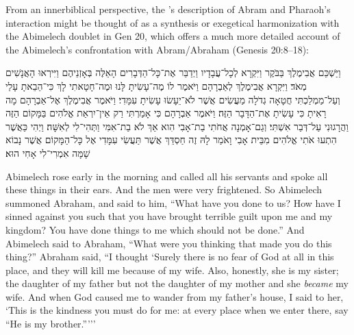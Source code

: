 From an innerbiblical perspective, the \ga's description of Abram and Pharaoh's interaction might be thought of as a synthesis or exegetical harmonization with the Abimelech doublet in Gen 20, which offers a much more detailed account of the Abimelech's confrontation with Abram/Abraham (Genesis 20:8--18):

\begin{hebrewtranslation}
    וַיַּשְׁכֵּם אֲבִימֶלֶךְ בַּבֹּקֶר וַיִּקְרָא לְכָל־עֲבָדָיו וַיְדַבֵּר אֶת־כָּל־הַדְּבָרִים הָאֵלֶּה בְּאָזְנֵיהֶם וַיִּירְאוּ הָאֲנָשִׁים מְאֹד׃
    וַיִּקְרָא אֲבִימֶלֶךְ לְאַבְרָהָם וַיֹּאמֶר לוֹ מֶה־עָשִׂיתָ לָּנוּ וּמֶה־חָטָאתִי לָךְ כִּי־הֵבֵאתָ עָלַי וְעַל־מַמְלַכְתִּי חֲטָאָה גְדֹלָה מַעֲשִׂים אֲשֶׁר לֹא־יֵעָשׂוּ עָשִׂיתָ עִמָּדִי׃
    וַיֹּאמֶר אֲבִימֶלֶךְ אֶל־אַבְרָהָם מָה רָאִיתָ כִּי עָשִׂיתָ אֶת־הַדָּבָר הַזֶּה׃
    וַיֹּאמֶר אַבְרָהָם כִּי אָמַרְתִּי רַק אֵין־יִרְאַת אֱלֹהִים בַּמָּקוֹם הַזֶּה וַהֲרָגוּנִי עַל־דְּבַר אִשְׁתִּי׃
    וְגַם־אָמְנָה אֲחֹתִי בַת־אָבִי הִוא אַךְ לֹא בַת־אִמִּי וַתְּהִי־לִי לְאִשָּׁה׃
    וַיְהִי כַּאֲשֶׁר הִתְעוּ אֹתִי אֱלֹהִים מִבֵּית אָבִי וָאֹמַר לָהּ זֶה חַסְדֵּךְ אֲשֶׁר תַּעֲשִׂי עִמָּדִי אֶל כָּל־הַמָּקוֹם אֲשֶׁר נָבוֹא שָׁמָּה אִמְרִי־לִי אָחִי הוּא׃
\end{hebrewtranslation}

\begin{translation}
    Abimelech rose early in the morning and called all his servants and spoke all these things in their ears. And the men were very frightened. 
    So Abimelech summoned Abraham, and said to him, ``What have you done to us? How have I sinned against you such that you have brought terrible guilt upon me and my kingdom? You have done things to me which should not be done.''
    And Abimelech said to Abraham, “What were you thinking that made you do this thing?” 
    Abraham said, ``I thought `Surely there is no fear of God at all in this place, and they will kill me because of my wife. 
    Also, honestly, she is my sister; the daughter of my father but not the daughter of my mother and she \emph{became} my wife.
    And when God caused me to wander from my father's house, I said to her, `This is the kindness you must do for me: at every place when we enter there, say  ``He is my brother.'''''
\end{translation}

